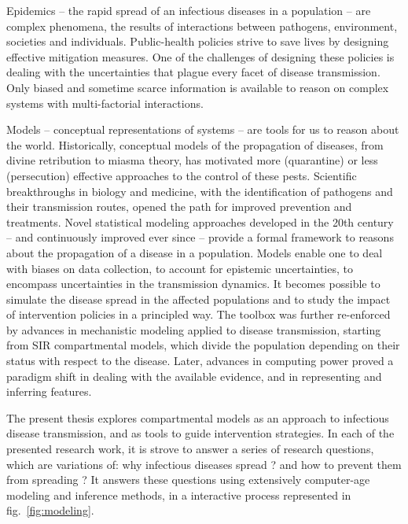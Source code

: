 Epidemics -- the rapid spread of an infectious diseases in a population -- are  complex phenomena, the results of interactions between pathogens, environment, societies and individuals\cite{Rinaldo:RiverNetworksEcological:2020a, Buckee:ThinkingClearlySocial:2021, Heesterbeek:ModelingInfectiousDisease:2015}. Public-health policies strive to save lives by designing effective mitigation measures. One of the challenges of designing these policies is dealing with the uncertainties that plague every facet of disease transmission. Only biased and sometime scarce information is available to reason on complex systems with multi-factorial interactions.

Models -- conceptual representations of systems -- are tools for us to reason about the world. Historically, conceptual models of the propagation of diseases, from divine retribution to miasma theory, has motivated more (quarantine) or less (persecution) effective approaches to the control of these pests. Scientific breakthroughs in biology and medicine, with the identification of pathogens and their transmission routes, opened the path for improved prevention and treatments. Novel statistical modeling approaches\cite[-3\baselineskip]{Freedman:AssociationCausationRemarks:1999} developed in the 20th century -- and continuously improved ever since\cite{Gelman:WhatAreMost:2021} --  provide a formal framework to reasons about the propagation of a disease in a population. Models enable one to deal with biases on data collection, to account for epistemic uncertainties, to encompass uncertainties in the transmission dynamics. It becomes possible to simulate the disease spread in the affected populations and to study the impact of intervention policies in a principled way. The toolbox was further re-enforced by advances in mechanistic modeling applied to disease transmission, starting from SIR compartmental models\cite{Kermack:ContributionMathematicalTheory:1927, Anderson:PopulationBiologyInfectious:1979}, which divide the population depending on their status with respect to the disease. Later, advances in computing power proved a paradigm shift in dealing with the available evidence, and in representing and inferring features. 

The present thesis explores compartmental models as an approach to infectious disease transmission, and as tools to guide intervention strategies. In each of the presented research work, it is strove to answer a series of research questions, which are variations of: why infectious diseases spread ? and how to prevent them from spreading ? It answers these questions using extensively computer-age modeling and inference methods, in a interactive process represented in fig.~\ref{fig:modeling}. %


